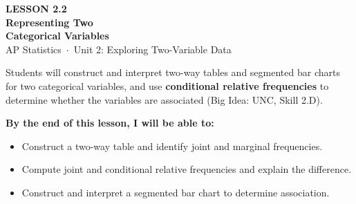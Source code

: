 \documentclass[aspectratio=169, 11pt]{beamer}
\begin{document}
{
\begin{frame}[plain]
  \vspace{2.8cm}
  \hspace{0.55cm}%
  \begin{minipage}{0.9\textwidth}
    {\color{goldacc}\bfseries\small LESSON 2.2}\\[0.5cm]
    {\color{white}\bfseries\LARGE Representing Two\\[0.25cm]
      Categorical Variables}\\[1.4cm]
    {\color{skymid}\small AP Statistics~$\cdot$~Unit 2: Exploring Two-Variable Data}
  \end{minipage}
\end{frame}
}

{
\begin{frame}[t, plain]
  \vspace{0.45cm}\par
  \hspace{0.55cm}%
  \begin{minipage}{0.9\textwidth}


    \normalsize
    Students will construct and interpret two-way tables and segmented bar charts
    for two categorical variables, and use \textbf{conditional relative frequencies}
    to determine whether the variables are associated (Big Idea: UNC, Skill 2.D).

    \vspace{0.6cm}

    \normalsize\textbf{\color{navy}By the end of this lesson, I will be able to:}
    \smallskip
    \begin{itemize}
      \setlength{\itemsep}{0.3em}
      \item Construct a two-way table and identify joint and marginal frequencies.
      \item Compute joint and conditional relative frequencies and explain the difference.
      \item Construct and interpret a segmented bar chart to determine association.
    \end{itemize}

  \end{minipage}
\end{frame}
}
\end{document}
